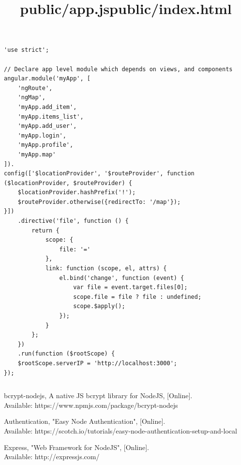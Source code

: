 \documentclass[a4paper]{article}
\begin{document}
\title{public/app.js}
\begin{lstlisting}[style=htmlcssjs]
'use strict';

// Declare app level module which depends on views, and components
angular.module('myApp', [
    'ngRoute',
    'ngMap',
    'myApp.add_item',
    'myApp.items_list',
    'myApp.add_user',
    'myApp.login',
    'myApp.profile',
    'myApp.map'
]).
config(['$locationProvider', '$routeProvider', function ($locationProvider, $routeProvider) {
    $locationProvider.hashPrefix('!');
    $routeProvider.otherwise({redirectTo: '/map'});
}])
    .directive('file', function () {
        return {
            scope: {
                file: '='
            },
            link: function (scope, el, attrs) {
                el.bind('change', function (event) {
                    var file = event.target.files[0];
                    scope.file = file ? file : undefined;
                    scope.$apply();
                });
            }
        };
    })
    .run(function ($rootScope) {
    $rootScope.serverIP = 'http://localhost:3000';
});
\end{lstlisting}

\title{public/index.html}
\begin{lstlisting}[style=htmlcssjs]
\end{lstlisting}

\begin{thebibliography}{}	  
    
    bcrypt-nodejs,  A native JS bcrypt library for NodeJS, [Online].\\
    Available: https://www.npmjs.com/package/bcrypt-nodejs
    
    Authentication, "Easy Node Authentication", [Online]. \\
    Available: https://scotch.io/tutorials/easy-node-authentication-setup-and-local
    
    Express, "Web Framework for NodeJS", [Online]. \\
    Available: http://expressjs.com/
    
\end{thebibliography}
\end{document}

